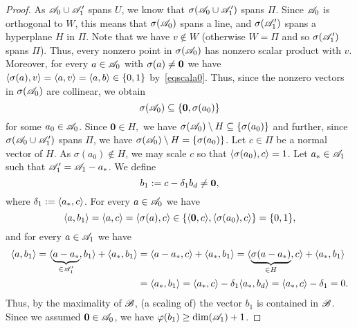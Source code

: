\begin{proof}
    As ${\mathscr{A}}_0 \cup {\mathscr{A}}_1'$ spans $U$, we know that $\sigma({\mathscr{A}}_0 \cup {\mathscr{A}}_1')$ spans $\Pi$.
    Since ${\mathscr{A}}_0$ is orthogonal to $W$, this means that $\sigma({\mathscr{A}}_0)$ spans a line, and $\sigma({\mathscr{A}}_1')$ spans a hyperplane $H$ in $\Pi$.
    Note that we have $v \notin W$ (otherwise $W = \Pi$ and so $\sigma({\mathscr{A}}_1')$ spans $\Pi$).
    Thus, every nonzero point in $\sigma({\mathscr{A}}_0)$ has nonzero scalar product with $v$.
    Moreover, for every $a \in {\mathscr{A}}_0$ with $\sigma(a) \ne \mathbf{0}$ we have $\langle \sigma(a), v\rangle = \langle a, v\rangle = \langle a,b\rangle \in \{0,1\}$ by~\eqref{eqscala0}.
    Thus, since the nonzero vectors in $\sigma({\mathscr{A}}_0)$ are collinear, we obtain
    \[
        \sigma({\mathscr{A}}_0) \subseteq \{\mathbf{0}, \sigma(a_0)\}
    \]
    for some $a_0 \in {\mathscr{A}}_0$. Since $\mathbf 0\in H,$ we have $\sigma({\mathscr{A}}_0)\setminus H\subseteq \{\sigma(a_0)\}$ and further, since $\sigma({\mathscr{A}}_0\cup {\mathscr{A}}_1')$ spans $\Pi$, we have $\sigma({\mathscr{A}}_0)\setminus H= \{\sigma(a_0)\}$. 
    Let $c \in \Pi$ be a normal vector of $H$.  
    As $\sigma(a_0) \notin H$, we may scale $c$ so that $\langle \sigma(a_0), c\rangle = 1$.
    Let $a_* \in {\mathscr{A}}_1$ such that ${\mathscr{A}}_1' = {\mathscr{A}}_1 - a_*$.
    We define
    \[
        b_1 := c - \delta_1 b_d \ne \mathbf{0},
    \]
    where $\delta_1 := \langle a_*, c\rangle$.
    For every $a \in {\mathscr{A}}_0$ we have
    \[
        \langle a,b_1\rangle = \langle a, c\rangle = \langle \sigma(a), c\rangle \in \{\langle \mathbf{0},c\rangle, \langle \sigma(a_0), c\rangle\} = \{0,1\},
    \]
    and for every $a \in {\mathscr{A}}_1$ we have
    \begin{align*}
        \langle a,b_1\rangle
        = \langle \underbrace{a - a_*}_{\in {\mathscr{A}}_1'}, b_1\rangle + \langle a_*, b_1\rangle
        &= \langle a - a_*, c\rangle + \langle a_*, b_1\rangle
         = \langle {\underbrace{\sigma(a - a_*)}_{\in H}}, c\rangle + \langle a_*, b_1\rangle \\
        & = \langle a_*, b_1\rangle
        = \langle a_*, c\rangle - \delta_1 \langle a_*, b_d\rangle
        = \langle a_*, c\rangle - \delta_1
        = 0.
    \end{align*}
    Thus, by the maximality of ${\mathscr{B}}$, (a scaling of) the vector $b_1$ is contained in ${\mathscr{B}}$.
    Since we assumed $\mathbf{0} \in {\mathscr{A}}_0$, we have $\varphi(b_1) \ge \dim({\mathscr{A}}_1) + 1$.


\end{proof}
